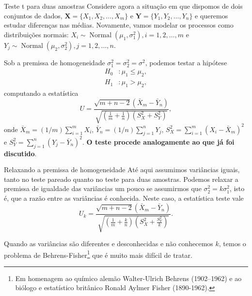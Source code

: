 \begin{frame}{Teste t para duas amostras}
Considere agora a situação em que dispomos de dois conjuntos de dados, $\boldsymbol{X} = \{X_1, X_2, \ldots, X_m\}$ e $\boldsymbol{Y} = \{Y_1, Y_2, \ldots, Y_n\}$ e queremos estudar diferenças nas médias.
Novamente, vamos modelar os processos como distribuições normais: $X_i \sim\operatorname{Normal}(\mu_1, \sigma_1^2), i = 1, 2, \ldots, m$ e $Y_j \sim\operatorname{Normal}(\mu_2, \sigma_2^2), j = 1, 2, \ldots, n$.

Sob a premissa de homogeneidade $\sigma_1^2 = \sigma_2^2 = \sigma^2$, podemos testar a hipótese
\begin{align*}
   H_0 &: \mu_1 \leq \mu_2, \\
   H_1 &: \mu_1 > \mu_2,
\end{align*}
computando a estatística 
\begin{equation*}
 U = \frac{\sqrt{m + n - 2}(\bar{X}_m - \bar{Y}_n)}{\sqrt{\left(\frac{1}{m} + \frac{1}{n}\right) (S_X^2 + S_Y^2)}},
\end{equation*}
onde $\bar{X}_m = (1/m)\sum_{i=1}^m X_i$,  $\bar{Y}_n = (1/n)\sum_{j=1}^n Y_j$, $S_X^2 = \sum_{i=1}^m (X_i-\bar{X}_m)^2$ e $S_Y^2 = \sum_{j=1}^n (Y_j-\bar{Y}_n)^2$.
\textbf{O teste procede analogamente ao que já foi discutido}.
\end{frame}

\begin{frame}{Relaxando a premissa de homogeneidade}
Até aqui assumimos variâncias iguais, tanto no teste pareado quanto no teste para duas amostras. 
Podemos relaxar a premissa de igualdade das variâncias um pouco se assumirmos que $\sigma_2^2 = k\sigma_1^2$, isto é, que a razão entre as variâncias é conhecida.
Neste caso, a estatística teste vale
\begin{equation*}
 U_k = \frac{\sqrt{m + n - 2}(\bar{X}_m - \bar{Y}_n)}{\sqrt{\left(\frac{1}{m} + \frac{k}{n}\right) (S_X^2 + \frac{S_Y^2}{k})}}.
\end{equation*}

Quando as variâncias são diferentes e desconhecidas e não conhecemos $k$, temos o problema de Behrens-Fisher\footnote{Em homenagem ao químico alemão Walter-Ulrich Behrens (1902--1962) e ao biólogo e estatístico britânico Ronald Aylmer Fisher (1890-1962).} que é muito mais difícil de tratar.
\end{frame}

